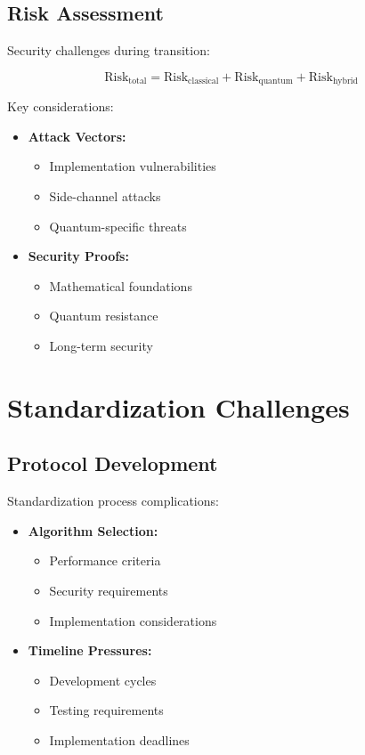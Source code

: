 \begin{itemize}
\subsection{Risk Assessment}\label{subsec:risk}
Security challenges during transition:

\begin{equation}\label{eq:risk}
    \text{Risk}_{\text{total}} = \text{Risk}_{\text{classical}} + \text{Risk}_{\text{quantum}} + \text{Risk}_{\text{hybrid}}
\end{equation}

Key considerations:
\begin{itemize}
    \item \textbf{Attack Vectors:}
    \begin{itemize}
        \item Implementation vulnerabilities
        \item Side-channel attacks
        \item Quantum-specific threats
    \end{itemize}
    \item \textbf{Security Proofs:}
    \begin{itemize}
        \item Mathematical foundations
        \item Quantum resistance
        \item Long-term security
    \end{itemize}
\end{itemize}

\section{Standardization Challenges}\label{sec:standardization}

\subsection{Protocol Development}\label{subsec:protocols}
Standardization process complications:

\begin{itemize}
    \item \textbf{Algorithm Selection:}
    \begin{itemize}
        \item Performance criteria
        \item Security requirements
        \item Implementation considerations
    \end{itemize}
    \item \textbf{Timeline Pressures:}
    \begin{itemize}
        \item Development cycles
        \item Testing requirements
        \item Implementation deadlines
    \end{itemize}
\end{itemize}


\end{itemize}
